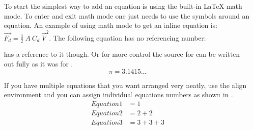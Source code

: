   To start the simplest way to add an equation is using the built-in \LaTeX{} math mode. 
  To enter and exit math mode one just needs to use the  symbols around an equation.
  An example of using math mode to get an inline equation is: $\vec{F_{d}}=\frac{1}{2}\ A\ C_{d}\ \vec{V}^{2}$.
  The following equation has no referencing number:
  
   has a reference to it though. Or for more control the source for  can be written out fully as it was for .  
  \begin{equation}\label{eq:quickEq2}
    \pi = 3.1415...
  \end{equation}
  
  If you have multiple equations that you want arranged very neatly, use the align environment and you can assign individual equations numbers as shown in .
  \begin{align}%
    \label{eq:multiref:a} Equation1 & = 1\\
    \label{eq:multiref:b} Equation2 & = 2 + 2\\
    \label{eq:multiref:c} Equation3 & = 3 + 3 + 3
  \end{align}
  
  
  
  \printreferences %
